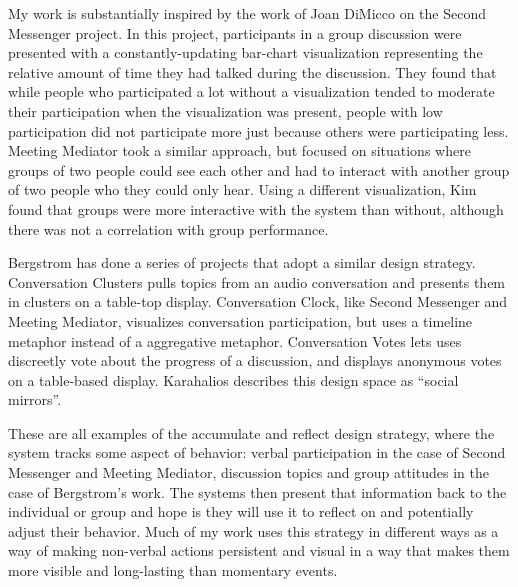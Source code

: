 \documentclass{tufte-handout}
\begin{document}
My work is substantially inspired by the work of Joan DiMicco on the Second Messenger project. \citet{second_messenger} In this project, participants in a group discussion were presented with a constantly-updating bar-chart visualization representing the relative amount of time they had talked during the discussion. They found that while people who participated a lot without a visualization tended to moderate their participation when the visualization was present, people with low participation did not participate more just because others were participating less. Meeting Mediator \citet{meeting_mediator} took a similar approach, but focused on situations where groups of two people could see each other and had to interact with another group of two people who they could only hear. Using a different visualization, Kim found that groups were more interactive with the system than without, although there was not a correlation with group performance. 

Bergstrom has done a series of projects that adopt a similar design strategy. Conversation Clusters pulls topics from an audio conversation and presents them in clusters on a table-top display. \citet{conv_clusters} Conversation Clock, like Second Messenger and Meeting Mediator, visualizes conversation participation, but uses a timeline metaphor instead of a aggregative metaphor. \citet{conv_clock} Conversation Votes lets uses discreetly vote about the progress of a discussion, and displays anonymous votes on a table-based display.\citet{conv_votes} Karahalios describes this design space as ``social mirrors''. \citet{social_mirrors}


These are all examples of the accumulate and reflect design strategy, where the system tracks some aspect of behavior: verbal participation in the case of Second Messenger and Meeting Mediator, discussion topics and group attitudes in the case of Bergstrom's work. The systems then present that information back to the individual or group and hope is they will use it to reflect on and potentially adjust their behavior. Much of my work uses this strategy in different ways as a way of making non-verbal actions persistent and visual in a way that makes them more visible and long-lasting than momentary events.  



\end{document}
